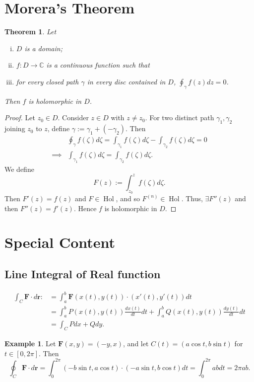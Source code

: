 \documentclass[12pt,openany]{book}
\newtheorem{theorem}{Theorem}[chapter]
\theoremstyle{definition}
\newtheorem{example}{Example}[section]
\newcommand{\C}{\mathbb{C}}
\newcommand{\of}[1]{\left( #1 \right)}
\newcommand{\Hol}{\operatorname{Hol}}
\begin{document}
	\section{Morera's Theorem}
	\begin{tcolorbox}[colback=white,colframe=thmcolor,arc=5pt,title={\color{white}\bf Morera's Theorem}]
		\begin{theorem}
			Let \begin{enumerate}[(i)]
				\item $D$ is a domain;
				\item $f:D\to\C$ is a continuous function such that
				\item for every closed path $\gamma$ in every disc contained in $D$, $\oint_\gamma f\of{z}dz=0$.
			\end{enumerate} Then $f$ is holomorphic in $D$.
		\end{theorem}
	\end{tcolorbox}
	\begin{proof}
		Let $z_0\in D$. Consider $z\in D$ with $z\neq z_0$. For two distinct path $\gamma_1,\gamma_2$ joining $z_0$ to $z$, define $\gamma:=\gamma_1+\of{-\gamma_2}$. Then \begin{align*}
		&\oint_\gamma f\of{\zeta}d\zeta=\int_{\gamma_1}f\of{\zeta}d\zeta-\int_{\gamma_2}f\of{\zeta}d\zeta=0\\
		\implies&\int_{\gamma_1}f\of{\zeta}d\zeta=\int_{\gamma_2}f\of{\zeta}d\zeta.
		\end{align*} We define \[
		F\of{z}:=\int_{z_0}^zf\of{\zeta}d\zeta.
		\] Then $F'\of{z}=f\of{z}$ and $F\in\Hol$, and so $F^{(n)}\in\Hol$. Thus, $\exists F''\of{z}$ and then $F''\of{z}=f'\of{z}$. Hence $f$ is holomorphic in $D$.
	\end{proof}
	
	\newpage
	\section{Special Content}
	\subsection{Line Integral of Real function}
	
	\begin{align*}
	\int_C\textbf{F}\cdot d\textbf{r}:&=\int_a^b\textbf{F}\of{x(t),y(t)}\cdot\of{x'(t),y'(t)}dt\\
	&=\int_a^bP\of{x(t),y(t)}\frac{dx(t)}{dt}dt+\int_a^bQ\of{x(t),y(t)}\frac{dy(t)}{dt}dt\\
	&=\int_C Pdx+Qdy.
	\end{align*}
	\vspace{4pt}
	\begin{example}
		Let $\textbf{F}(x,y)=\of{-y,x}$, and let $C\of{t}=\of{a\cos t,b\sin t}$ for $t\in[0,2\pi]$. Then \[
		\oint_C\textbf{F}\cdot d\textbf{r}=\int_0^{2\pi}\of{-b\sin t, a\cos t}\cdot\of{-a\sin t, b\cos t}dt=\int_0^{2\pi}ab dt=2\pi ab.
		\]
	\end{example}
	\vspace{8pt}
\end{document}
